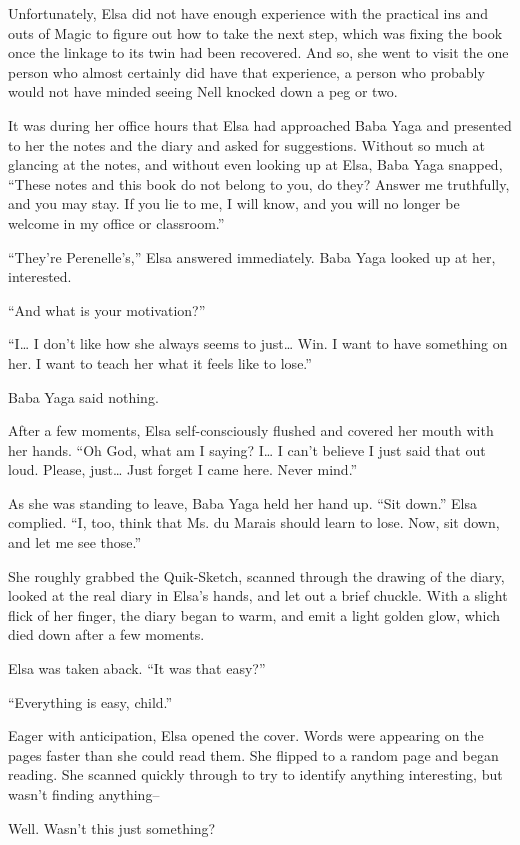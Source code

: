 Unfortunately, Elsa did not have enough experience with the practical ins and outs of Magic to figure out how to take the next step, which was fixing the book once the linkage to its twin had been recovered. And so, she went to visit the one person who almost certainly did have that experience, a person who probably would not have minded seeing Nell knocked down a peg or two.

It was during her office hours that Elsa had approached Baba Yaga and presented to her the notes and the diary and asked for suggestions. Without so much at glancing at the notes, and without even looking up at Elsa, Baba Yaga snapped, “These notes and this book do not belong to you, do they? Answer me truthfully, and you may stay. If you lie to me, I will know, and you will no longer be welcome in my office or classroom.”

“They’re Perenelle’s,” Elsa answered immediately. Baba Yaga looked up at her, interested.

“And what is your motivation?”

“I… I don’t like how she always seems to just… Win. I want to have something on her. I want to teach her what it feels like to lose.”

Baba Yaga said nothing.

After a few moments, Elsa self-consciously flushed and covered her mouth with her hands. “Oh God, what am I saying? I… I can’t believe I just said that out loud. Please, just… Just forget I came here. Never mind.”

As she was standing to leave, Baba Yaga held her hand up. “Sit down.” Elsa complied. “I, too, think that Ms. du Marais should learn to lose. Now, sit down, and let me see those.”

She roughly grabbed the Quik-Sketch, scanned through the drawing of the diary, looked at the real diary in Elsa’s hands, and let out a brief chuckle. With a slight flick of her finger, the diary began to warm, and emit a light golden glow, which died down after a few moments.

Elsa was taken aback. “It was that easy?”

“Everything is easy, child.”

Eager with anticipation, Elsa opened the cover. Words were appearing on the pages faster than she could read them. She flipped to a random page and began reading. She scanned quickly through to try to identify anything interesting, but wasn’t finding anything–

Well. Wasn’t this just something?

